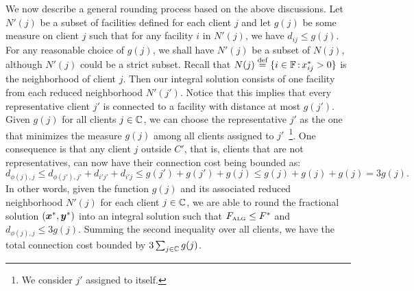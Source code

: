 \documentclass[oneside,final]{ucr}
\begin{document}
We now describe a general rounding process based on the
above discussions. Let $N'(j)$ be a subset of facilities
defined for each client $j$ and let $g(j)$ be some measure
on client $j$ such that for any facility $i$ in $N'(j)$, we
have $d_{ij} \leq g(j)$. For any reasonable choice of
$g(j)$, we shall have $N'(j)$ be a subset of $N(j)$,
although $N'(j)$ could be a strict subset. Recall that $N(j)
\stackrel{\text{def}}{=} \{i\in\mathbb{F} {\,:\,} x_{ij}^\ast > 0\}$ is the
neighborhood of client $j$. Then our integral solution
consists of one facility from each reduced neighborhood
$N'(j')$. Notice that this implies that every representative
client $j'$ is connected to a facility with distance at most
$g(j')$. Given $g(j)$ for all clients $j\in\mathbb{C}$, we
can choose the representative $j'$ as the one that minimizes
the measure $g(j)$ among all clients assigned to
$j'$~\footnote{We consider $j'$ assigned to itself.}. One
consequence is that any client $j$ outside $C'$, that is,
clients that are not representatives, can now have their
connection cost being bounded as:
\begin{equation*}
  d_{\phi(j), j} \leq d_{\phi(j'), j'} + d_{i'j'} + d_{i'j}
  \leq g(j') + g(j') + g(j) \leq g(j) + g(j) + g(j) = 3g(j).
\end{equation*}
In other words, given the function $g(j)$ and its associated
reduced neighborhood $N'(j)$ for each client $j\in
\mathbb{C}$, we are able to round the fractional solution
$(\boldsymbol{x}^\ast, \boldsymbol{y}^\ast)$ into an integral solution such that
$F_{\mbox{\tiny\rm ALG}} \leq F^\ast$ and $d_{\phi(j), j} \leq 3
g(j)$. Summing the second inequality over all clients, we
have the total connection cost bounded by
$3\sum_{j\in\mathbb{C}} g(j)$.
\end{document}

